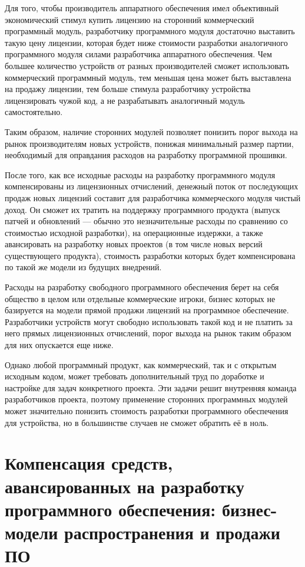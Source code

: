\documentclass{article}
\begin{document}
Для того, чтобы производитель аппаратного обеспечения имел объективный экономический стимул купить лицензию на сторонний коммерческий программный модуль, разработчику программного модуля достаточно выставить такую цену лицензии, которая будет ниже стоимости разработки аналогичного программного модуля силами разработчика аппаратного обеспечения. Чем большее количество устройств от разных производителей сможет использовать коммерческий программный модуль, тем меньшая цена может быть выставлена на продажу лицензии, тем больше стимула разработчику устройства лицензировать чужой код, а не разрабатывать аналогичный модуль самостоятельно.

Таким образом, наличие сторонних модулей позволяет понизить порог выхода на рынок производителям новых устройств, понижая минимальный размер партии, необходимый для оправдания расходов на разработку программной прошивки.

После того, как все исходные расходы на разработку программного модуля компенсированы из лицензионных отчислений, денежный поток от последующих продаж новых лицензий составит для разработчика коммерческого модуля чистый доход. Он сможет их тратить на поддержку программного продукта (выпуск патчей и обновлений — обычно это незначительные расходы по сравнению со стоимостью исходной разработки), на операционные издержки, а также авансировать на разработку новых проектов (в том числе новых версий существующего продукта), стоимость разработки которых будет компенсирована по такой же модели из будущих внедрений.

Расходы на разработку свободного программного обеспечения берет на себя общество в целом или отдельные коммерческие игроки, бизнес которых не базируется на модели прямой продажи лицензий на программное обеспечение. Разработчики устройств могут свободно использовать такой код и не платить за него прямых лицензионных отчислений, порог выхода на рынок таким образом для них опускается еще ниже.

Однако любой программный продукт, как коммерческий, так и с открытым исходным кодом, может требовать дополнительный труд по доработке и настройке для задач конкретного проекта. Эти задачи решит внутренняя команда разработчиков проекта, поэтому применение сторонних программных модулей может значительно понизить стоимость разработки программного обеспечения для устройства, но в большинстве случаев не сможет обратить её в ноль.

\section*{Компенсация средств, авансированных на разработку программного обеспечения: бизнес-модели распространения и продажи ПО}
\end{document}
